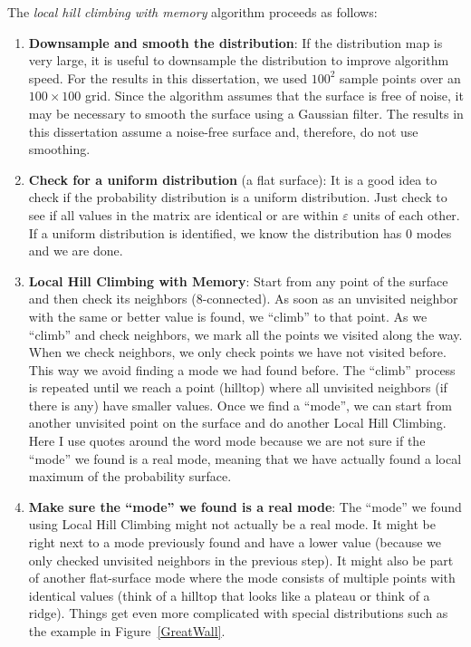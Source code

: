 The \textit{local hill climbing with memory} algorithm proceeds as follows:
\begin{enumerate}
\item \textbf{Downsample and smooth the distribution}: If the distribution map is very large, it is useful to downsample the distribution to improve algorithm speed. For the results in this dissertation, we used $100^2$ sample points over an $100 \times 100$ grid. Since the algorithm assumes that the surface is free of noise, it may be necessary to smooth the surface using a Gaussian filter. The results in this dissertation assume a noise-free surface and, therefore, do not use smoothing.
\item \textbf{Check for a uniform distribution} (a flat surface): It is a good idea to check if the probability distribution is a uniform distribution. Just check to see if all values in the matrix are identical or are within $\varepsilon$ units of each other. If a uniform distribution is identified, we know the distribution has 0 modes and we are done.
\item \textbf{Local Hill Climbing with Memory}: Start from any point of the surface and then check its neighbors (8-connected). As soon as an unvisited neighbor with the same or better value is found, we ``climb'' to that point. As we ``climb'' and check neighbors, we mark all the points we visited along the way. When we check neighbors, we only check points we have not visited before. This way we avoid finding a mode we had found before. The ``climb'' process is repeated until we reach a point (hilltop) where all unvisited neighbors (if there is any) have smaller values. Once we find a ``mode'', we can start from another unvisited point on the surface and do another Local Hill Climbing. Here I use quotes around the word mode because we are not sure if the ``mode'' we found is a real mode, meaning that we have actually found a local maximum of the probability surface.
\item \textbf{Make sure the ``mode'' we found is a real mode}: The ``mode'' we found using Local Hill Climbing might not actually be a real mode. It might be right next to a mode previously found and have a lower value (because we only checked unvisited neighbors in the previous step). It might also be part of another flat-surface mode where the mode consists of multiple points with identical values (think of a hilltop that looks like a plateau or think of a ridge). Things get even more complicated with special distributions such as the example in Figure~\ref{GreatWall}. 


\end{enumerate}
